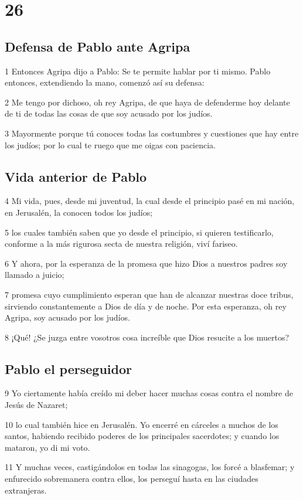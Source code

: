 \chapter{26}

\section*{Defensa de Pablo ante Agripa}

\par 1 Entonces Agripa dijo a Pablo: Se te permite hablar por ti mismo. Pablo entonces, extendiendo la mano, comenzó así su defensa:
\par 2 Me tengo por dichoso, oh rey Agripa, de que haya de defenderme hoy delante de ti de todas las cosas de que soy acusado por los judíos.
\par 3 Mayormente porque tú conoces todas las costumbres y cuestiones que hay entre los judíos; por lo cual te ruego que me oigas con paciencia.

\section*{Vida anterior de Pablo}

\par 4 Mi vida, pues, desde mi juventud, la cual desde el principio pasé en mi nación, en Jerusalén, la conocen todos los judíos;
\par 5 los cuales también saben que yo desde el principio, si quieren testificarlo, conforme a la más rigurosa secta de nuestra religión, viví fariseo.
\par 6 Y ahora, por la esperanza de la promesa que hizo Dios a nuestros padres soy llamado a juicio;
\par 7 promesa cuyo cumplimiento esperan que han de alcanzar nuestras doce tribus, sirviendo constantemente a Dios de día y de noche. Por esta esperanza, oh rey Agripa, soy acusado por los judíos.
\par 8 ¡Qué! ¿Se juzga entre vosotros cosa increíble que Dios resucite a los muertos?

\section*{Pablo el perseguidor}

\par 9 Yo ciertamente había creído mi deber hacer muchas cosas contra el nombre de Jesús de Nazaret;
\par 10 lo cual también hice en Jerusalén. Yo encerré en cárceles a muchos de los santos, habiendo recibido poderes de los principales sacerdotes; y cuando los mataron, yo di mi voto.
\par 11 Y muchas veces, castigándolos en todas las sinagogas, los forcé a blasfemar; y enfurecido sobremanera contra ellos, los perseguí hasta en las ciudades extranjeras.

